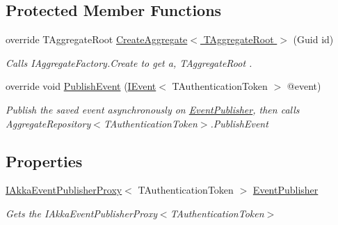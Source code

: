 \subsection*{Protected Member Functions}
\begin{DoxyCompactItemize}
\item 
override T\+Aggregate\+Root \hyperlink{classCqrs_1_1Akka_1_1Domain_1_1AkkaAggregateRepository_a889a80595755372614382c36092f30dc_a889a80595755372614382c36092f30dc}{Create\+Aggregate$<$ T\+Aggregate\+Root $>$} (Guid id)
\begin{DoxyCompactList}\small\item\em Calls I\+Aggregate\+Factory.\+Create to get a, {\itshape T\+Aggregate\+Root} . \end{DoxyCompactList}\item 
override void \hyperlink{classCqrs_1_1Akka_1_1Domain_1_1AkkaAggregateRepository_a144cbfdedb23039729ba5b3058f84e7a_a144cbfdedb23039729ba5b3058f84e7a}{Publish\+Event} (\hyperlink{interfaceCqrs_1_1Events_1_1IEvent}{I\+Event}$<$ T\+Authentication\+Token $>$ @event)
\begin{DoxyCompactList}\small\item\em Publish the saved {\itshape event}  asynchronously on \hyperlink{classCqrs_1_1Akka_1_1Domain_1_1AkkaAggregateRepository_a6c6400aef33fd3ec5dc3e479ebec6b40_a6c6400aef33fd3ec5dc3e479ebec6b40}{Event\+Publisher}, then calls Aggregate\+Repository$<$\+T\+Authentication\+Token$>$.\+Publish\+Event \end{DoxyCompactList}\end{DoxyCompactItemize}
\subsection*{Properties}
\begin{DoxyCompactItemize}
\item 
\hyperlink{interfaceCqrs_1_1Akka_1_1Events_1_1IAkkaEventPublisherProxy}{I\+Akka\+Event\+Publisher\+Proxy}$<$ T\+Authentication\+Token $>$ \hyperlink{classCqrs_1_1Akka_1_1Domain_1_1AkkaAggregateRepository_a6c6400aef33fd3ec5dc3e479ebec6b40_a6c6400aef33fd3ec5dc3e479ebec6b40}{Event\+Publisher}
\begin{DoxyCompactList}\small\item\em Gets the I\+Akka\+Event\+Publisher\+Proxy$<$\+T\+Authentication\+Token$>$ \end{DoxyCompactList}\end{DoxyCompactItemize}


